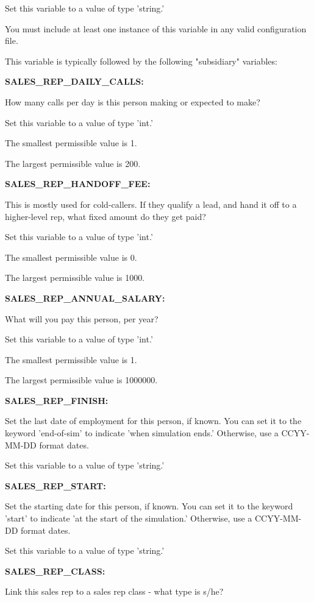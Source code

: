 Set this variable to a value of type 'string.'

You must include at least one instance of this variable in any valid configuration file.

This variable is typically followed by the following "subsidiary" variables:


\textbf{SALES\_REP\_DAILY\_CALLS:}


How many calls per day is this person making or expected to make?

Set this variable to a value of type 'int.'

The smallest permissible value is 1.

The largest permissible value is 200.


\textbf{SALES\_REP\_HANDOFF\_FEE:}


This is mostly used for cold-callers.  If they qualify a lead, and hand it off to a higher-level rep, what fixed amount do they get paid?

Set this variable to a value of type 'int.'

The smallest permissible value is 0.

The largest permissible value is 1000.


\textbf{SALES\_REP\_ANNUAL\_SALARY:}


What will you pay this person, per year?

Set this variable to a value of type 'int.'

The smallest permissible value is 1.

The largest permissible value is 1000000.


\textbf{SALES\_REP\_FINISH:}


Set the last date of employment for this person, if known.  You can set it to the keyword 'end-of-sim' to indicate 'when simulation ends.'  Otherwise, use a CCYY-MM-DD format dates.

Set this variable to a value of type 'string.'


\textbf{SALES\_REP\_START:}


Set the starting date for this person, if known.  You can set it to the keyword 'start' to indicate 'at the start of the simulation.'  Otherwise, use a CCYY-MM-DD format dates.

Set this variable to a value of type 'string.'


\textbf{SALES\_REP\_CLASS:}


Link this sales rep to a sales rep class - what type is s/he?

